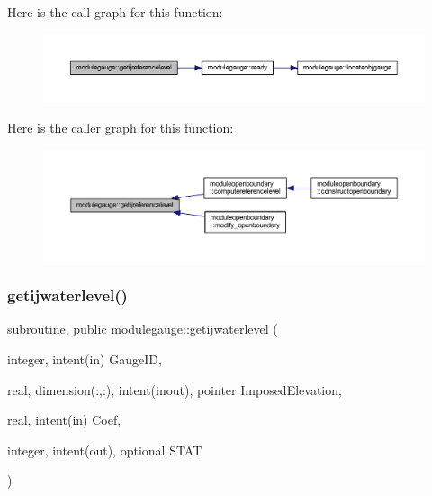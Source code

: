 Here is the call graph for this function\+:\nopagebreak
\begin{figure}[H]
\begin{center}
\leavevmode
\includegraphics[width=350pt]{namespacemodulegauge_a9b801d4a79f8bfd52e8276c2b5525b5e_cgraph}
\end{center}
\end{figure}
Here is the caller graph for this function\+:\nopagebreak
\begin{figure}[H]
\begin{center}
\leavevmode
\includegraphics[width=350pt]{namespacemodulegauge_a9b801d4a79f8bfd52e8276c2b5525b5e_icgraph}
\end{center}
\end{figure}
\mbox{\label{namespacemodulegauge_aa7b1b101cf558db427ad03b4a0e72f09}} 
\subsubsection{\texorpdfstring{getijwaterlevel()}{getijwaterlevel()}}
{\footnotesize\ttfamily subroutine, public modulegauge\+::getijwaterlevel (\begin{DoxyParamCaption}\item[{integer, intent(in)}]{Gauge\+ID,  }\item[{real, dimension(\+:,\+:), intent(inout), pointer}]{Imposed\+Elevation,  }\item[{real, intent(in)}]{Coef,  }\item[{integer, intent(out), optional}]{S\+T\+AT }\end{DoxyParamCaption})}

